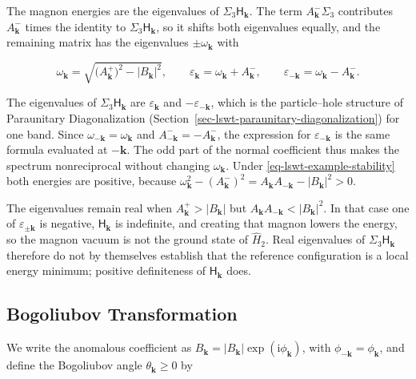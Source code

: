 The magnon energies are the eigenvalues of \(\Sigma_3\mathsf H_{\mathbf k}\). The term \(A_{\mathbf k}^{-}\Sigma_3\) contributes \(A_{\mathbf k}^{-}\) times the identity to \(\Sigma_3\mathsf H_{\mathbf k}\), so it shifts both eigenvalues equally, and the remaining matrix has the eigenvalues \(\pm\omega_{\mathbf k}\) with

\begin{equation}\label{eq-lswt-example-energies}
\omega_{\mathbf k}=\sqrt{\big(A_{\mathbf k}^{+}\big)^2-|B_{\mathbf k}|^2},
\qquad
\varepsilon_{\mathbf k}=\omega_{\mathbf k}+A_{\mathbf k}^{-},
\qquad
\varepsilon_{-\mathbf k}=\omega_{\mathbf k}-A_{\mathbf k}^{-}.
\end{equation}

The eigenvalues of \(\Sigma_3\mathsf H_{\mathbf k}\) are \(\varepsilon_{\mathbf k}\) and \(-\varepsilon_{-\mathbf k}\), which is the particle--hole structure of Paraunitary Diagonalization (Section~\ref{sec-lswt-paraunitary-diagonalization}) for one band. Since \(\omega_{-\mathbf k}=\omega_{\mathbf k}\) and \(A_{-\mathbf k}^{-}=-A_{\mathbf k}^{-}\), the expression for \(\varepsilon_{-\mathbf k}\) is the same formula evaluated at \(-\mathbf k\). The odd part of the normal coefficient thus makes the spectrum nonreciprocal without changing \(\omega_{\mathbf k}\). Under \eqref{eq-lswt-example-stability} both energies are positive, because \(\omega_{\mathbf k}^2-(A_{\mathbf k}^{-})^2=A_{\mathbf k}A_{-\mathbf k}-|B_{\mathbf k}|^2>0\).

The eigenvalues remain real when \(A_{\mathbf k}^{+}>|B_{\mathbf k}|\) but \(A_{\mathbf k}A_{-\mathbf k}<|B_{\mathbf k}|^2\). In that case one of \(\varepsilon_{\pm\mathbf k}\) is negative, \(\mathsf H_{\mathbf k}\) is indefinite, and creating that magnon lowers the energy, so the magnon vacuum is not the ground state of \(\hat H_2\). Real eigenvalues of \(\Sigma_3\mathsf H_{\mathbf k}\) therefore do not by themselves establish that the reference configuration is a local energy minimum; positive definiteness of \(\mathsf H_{\mathbf k}\) does.

\subsection{Bogoliubov Transformation}

We write the anomalous coefficient as \(B_{\mathbf k}=|B_{\mathbf k}|\exp(\mathrm i\phi_{\mathbf k})\), with \(\phi_{-\mathbf k}=\phi_{\mathbf k}\), and define the Bogoliubov angle \(\theta_{\mathbf k}\ge0\) by

